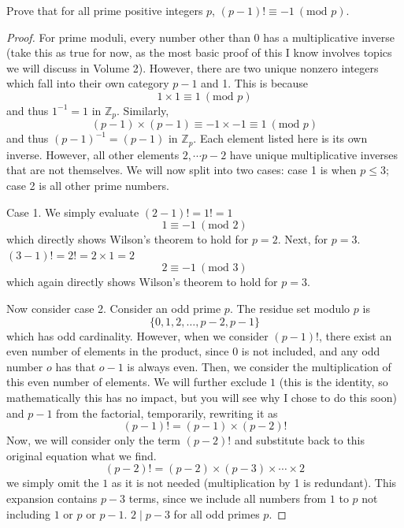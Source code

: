 \begin{theorem} 
Prove that for all prime positive integers $p$, $(p-1)! \equiv -1 ~ (\text{mod }p)$.
\end{theorem}
\begin{proof}
For prime moduli, every number other than $0$ has a multiplicative inverse (take this as true for now, as the most basic proof of this I know involves topics we will discuss in Volume 2). However, there are two unique nonzero integers which fall into their own category $p-1$ and 1. This is because 
\[
1 \times 1 \equiv 1 ~ (\text{mod }p)
\]
and thus $1^{-1} = 1$ in $\mathbb{Z}_p$. Similarly,
\[
(p-1) \times (p-1) \equiv -1 \times -1 \equiv 1 ~ (\text{mod }p)
\]
and thus $(p-1)^{-1} = (p-1)$ in $\mathbb{Z}_p$. Each element listed here is its own inverse. However, all other elements $2, \cdots p-2$ have unique multiplicative inverses that are not themselves. We will now split into two cases: case 1 is when $p \leq 3$; case 2 is all other prime numbers. 

Case 1. We simply evaluate $(2-1)! = 1! =1$
\[
1 \equiv -1 ~(\text{mod }2)
\]
which directly shows Wilson's theorem to hold for $p=2$. Next, for $p = 3$. $(3-1)! = 2! = 2 \times 1 = 2$
\[
2 \equiv -1 ~(\text{mod }3)
\]
which again directly shows Wilson's theorem to hold for $p=3$.

Now consider case 2. Consider an odd prime $p$. The residue set modulo $p$ is 
\[
\{0,  1, 2, \ldots, p-2, p-1\}
\]
which has odd cardinality. However, when we consider $(p-1)!$, there exist an even number of elements in the product, since 0 is not included, and any odd number $o$ has that $o-1$ is always even. Then, we consider the multiplication of this even number of elements. We will further exclude $1$ (this is the identity, so mathematically this has no impact, but you will see why I chose to do this soon) and $p-1$ from the factorial, temporarily, rewriting it as
\[
(p-1)! = (p-1)\times(p-2)!
\]
Now, we will consider only the term $(p-2)!$ and substitute back to this original equation what we find.
\[
(p-2)! = (p-2) \times (p-3) \times \cdots \times 2
\]
we simply omit the $1$ as it is not needed (multiplication by 1 is redundant). This expansion contains $p-3$ terms, since we include all numbers from $1$ to $p$ not including $1$ or $p$ or $p-1$. $2 \mid p-3$ for all odd primes $p$. 


\end{proof}
